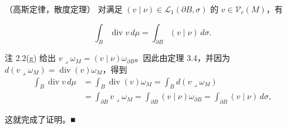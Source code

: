 \begin{theorem}

（高斯定律，散度定理） 对满足 $ (v \mid \nu) \in \mathcal{L}_1(\partial B,\sigma) $ 的 $ v \in \mathcal{V}_c(M) $，有

\[
\int_B \operatorname{div} v\, d\mu = \int_{\partial B} (v \mid \nu)\, d\sigma.
\]

\proofhead
注 2.2(g) 给出 $ v \lrcorner \omega_M = (v \mid \nu)\omega_{\partial B} $。因此由定理 3.4，并因为 $ d(v \lrcorner \omega_M) = \operatorname{div}(v)\omega_M $，得到
\begin{equation*}
\begin{aligned}
\int_B \operatorname{div} v\, d\mu &= \int_B \operatorname{div}(v)\omega_M = \int_B d(v \lrcorner \omega_M) \\ &= \int_{\partial B} v \lrcorner \omega_M = \int_{\partial B} (v \mid \nu)\omega_{\partial B} = \int_{\partial B} (v \mid \nu)\, d\sigma,
\end{aligned}
\end{equation*}

这就完成了证明。\nobreak\hspace{0.35em}■

\end{theorem}


